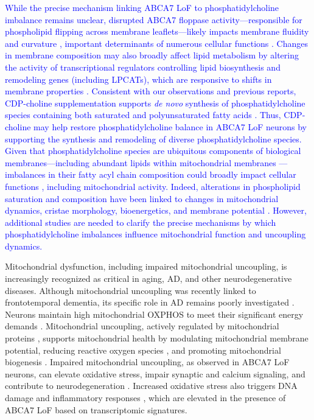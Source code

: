 \newcommand{\quoteI}{\textcolor{blue}{While the precise mechanism linking ABCA7 LoF to phosphatidylcholine imbalance remains unclear, disrupted ABCA7 floppase activity—responsible for phospholipid flipping across membrane leaflets—likely impacts membrane fluidity and curvature \cite{Takada2018-ce,Renne2018-fc}, important determinants of numerous cellular functions \cite{McMahon2015-gy,Yang2024-tz}. Changes in membrane composition may also broadly affect lipid metabolism by altering the activity of transcriptional regulators controlling lipid biosynthesis and remodeling genes (including LPCATs), which are responsive to shifts in membrane properties \cite{Ballweg2020-rv,Covino2018-hz}. Consistent with our observations and previous reports, CDP-choline supplementation supports \textit{de novo} synthesis of phosphatidylcholine species containing both saturated and polyunsaturated fatty acids \cite{Boumann2003-im}. Thus, CDP-choline may help restore phosphatidylcholine balance in ABCA7 LoF neurons by supporting the synthesis and remodeling of diverse phosphatidylcholine species. Given that phosphatidylcholine species are ubiquitous components of biological membranes—including abundant lipids within mitochondrial membranes \cite{Decker2024-ae}—imbalances in their fatty acyl chain composition could broadly impact cellular functions \cite{Wang2019-om,Van_der_Veen2017-ei}, including mitochondrial activity. Indeed, alterations in phospholipid saturation and composition have been linked to changes in mitochondrial dynamics, cristae morphology, bioenergetics, and membrane potential \cite{Decker2024-ae,Adachi2016-tg}. However, additional studies are needed to clarify the precise mechanisms by which phosphatidylcholine imbalances influence mitochondrial function and uncoupling dynamics.\label{quoteI-label}}} 
\quoteI

Mitochondrial dysfunction, including impaired mitochondrial uncoupling, is increasingly recognized as critical in aging, AD, and other neurodegenerative diseases. Although mitochondrial uncoupling was recently linked to frontotemporal dementia, its specific role in AD remains poorly investigated \cite{Bano2023-qz,Zong2024-tn,Demine2019-qj,Picca2023-gt}. Neurons maintain high mitochondrial OXPHOS to meet their significant energy demands \cite{Morant-Ferrando2023-va,Trigo2022-ym}. Mitochondrial uncoupling, actively regulated by mitochondrial proteins \cite{Park2023-fa,}, supports mitochondrial health by modulating mitochondrial membrane potential, reducing reactive oxygen species \cite{Demine2019-qj,Shadel2015-kt}, and promoting mitochondrial biogenesis \cite{Korshunov1997-aj,Wisloff2005-ho,Andrews2005-yy,}. Impaired mitochondrial uncoupling, as observed in ABCA7 LoF neurons, can elevate oxidative stress, impair synaptic and calcium signaling, and contribute to neurodegeneration \cite{Korshunov1997-aj,Wisloff2005-ho,Andrews2005-yy,}. Increased oxidative stress also triggers DNA damage and inflammatory responses \cite{Robert2020-sc,Volanti2002-mc,Canty1999-oj,Schreck1992-zr}, which are elevated in the presence of ABCA7 LoF based on transcriptomic signatures.

